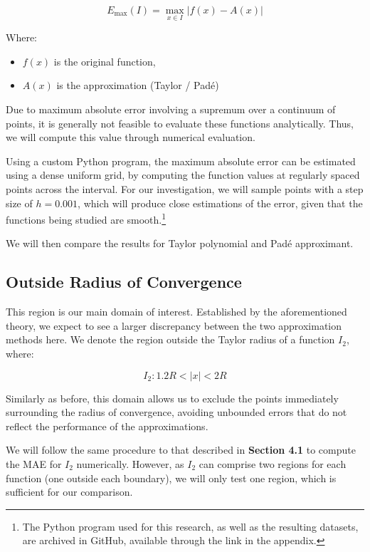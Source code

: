 \documentclass[a4paper, 12pt]{article}
\begin{document}
\begin{equation}
    E_{\max}(I)=\max_{x\in I}\left|f(x)-A(x)\right|
\end{equation}

Where:

\begin{itemize}
    \item $f(x)$ is the original function,
    \item $A(x)$ is the approximation (Taylor / Padé)
\end{itemize}

Due to maximum absolute error involving a supremum over a continuum of points, it is generally not feasible to evaluate these functions analytically. Thus, we will compute this value through numerical evaluation.

Using a custom Python program, the maximum absolute error can be estimated using a dense uniform grid, by computing the function values at regularly spaced points across the interval. For our investigation, we will sample points with a step size of $h = 0.001$, which will produce close estimations of the error, given that the functions being studied are smooth.\footnote{The Python program used for this research, as well as the resulting datasets, are archived in GitHub, available through the link in the appendix.}

We will then compare the results for Taylor polynomial and Padé approximant. 

\subsection{Outside Radius of Convergence}
This region is our main domain of interest. Established by the aforementioned theory, we expect to see a larger discrepancy between the two approximation methods here. We denote the region outside the Taylor radius of a function $I_2$, where:

\begin{equation*}
    I_2: 1.2R < |x| < 2R
\end{equation*}

Similarly as before, this domain allows us to exclude the points immediately surrounding the radius of convergence, avoiding unbounded errors that do not reflect the performance of the approximations.

We will follow the same procedure to that described in \textbf{Section 4.1} to compute the MAE for $I_2$ numerically. However, as $I_2$ can comprise two regions for each function (one outside each boundary), we will only test one region, which is sufficient for our comparison.
\end{document}
